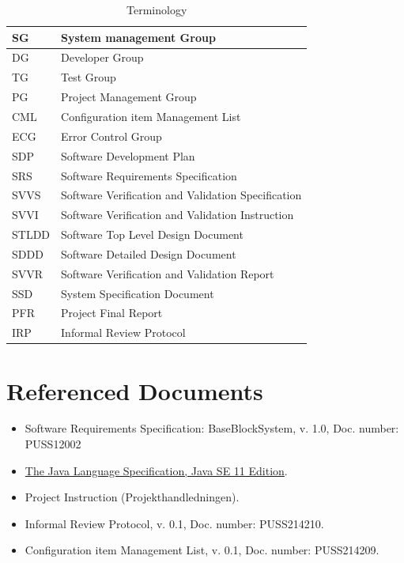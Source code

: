 \documentclass{article}
\begin{document}
    \begin{table}[h]
        \centering
        \begin{tabular}{| l | l |}
            \hline
                SG & System management Group \\
            \hline
                DG & Developer Group \\
            \hline
                TG & Test Group \\
            \hline
                PG & Project Management Group \\
            \hline 
                CML & Configuration item Management List \\
            \hline            
                ECG & Error Control Group \\
            \hline
                SDP & Software Development Plan \\
            \hline
                SRS & Software Requirements Specification \\
            \hline
                SVVS & Software Verification and Validation Specification \\
            \hline
                SVVI & Software Verification and Validation Instruction \\
            \hline
                STLDD & Software Top Level Design Document \\
            \hline
                SDDD & Software Detailed Design Document \\
            \hline
                SVVR & Software Verification and Validation Report \\
            \hline
                SSD & System Specification Document \\
            \hline
                PFR & Project Final Report \\
            \hline
                IRP & Informal Review Protocol \\
            \hline
        \end{tabular}
        \caption{Terminology}
        \label{Terminology}
    \end{table}

\section{Referenced Documents \label{refs}}
    \begin{itemize}
        \item Software Requirements Specification: BaseBlockSystem, v. 1.0, Doc. number: PUSS12002
        \item \href{https://docs.oracle.com/javase/specs/jls/se11/html/index.html}{The Java Language Specification, Java SE 11 Edition}.
        \item \label{PH} Project Instruction (Projekthandledningen).
        \item Informal Review Protocol, v. 0.1, Doc. number: PUSS214210.
        \item Configuration item Management List, v. 0.1, Doc. number: PUSS214209.
    \end{itemize}
    
\end{document}
